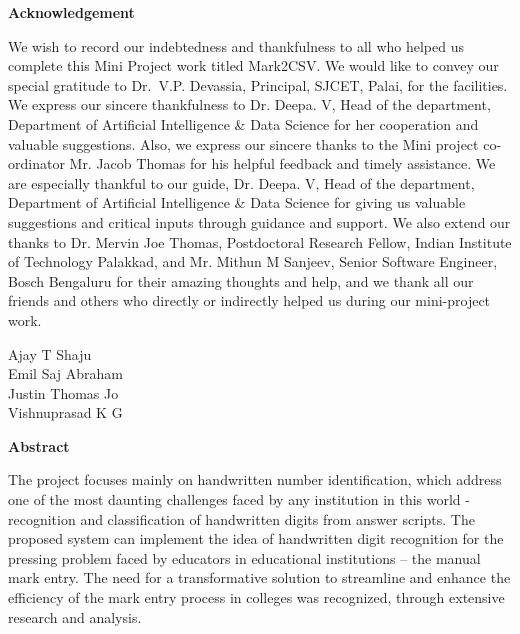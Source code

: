 \newpage
\thispagestyle{empty}
\begin{center}
  \vspace*{1cm}
  \textbf{\large Acknowledgement}
\end{center}
We wish to record our indebtedness and thankfulness to all who helped us complete this Mini Project work titled Mark2CSV. We would like to convey our special gratitude to Dr.~V.P. Devassia, Principal, SJCET, Palai, for the facilities. We express our sincere thankfulness to Dr. Deepa. V, Head of the department, Department of Artificial Intelligence \& Data Science for her cooperation and valuable suggestions. Also, we express our sincere thanks to the Mini project co-ordinator Mr. Jacob Thomas for his helpful feedback and timely assistance.
We are especially thankful to our guide, Dr. Deepa. V, Head of the department, Department of Artificial Intelligence \& Data Science for giving us valuable suggestions and critical inputs through guidance and support. We also extend our thanks to Dr. Mervin Joe Thomas, Postdoctoral Research Fellow, Indian Institute of Technology Palakkad, and Mr. Mithun M Sanjeev, Senior Software Engineer, Bosch Bengaluru for their amazing thoughts and help, and we thank all our friends and others who directly or indirectly helped us during our mini-project work.
 \\
\begin{flushright}
Ajay T Shaju \\
Emil Saj Abraham \\
Justin Thomas Jo \\
Vishnuprasad K G
\end{flushright}

\newpage
\thispagestyle{empty}
\begin{center}
  \textbf{\large Abstract}
\end{center}
The project focuses mainly on handwritten number identification, which address one of the most daunting challenges faced by any institution in this world - recognition and classification of handwritten digits from answer scripts. The proposed system can implement the idea of handwritten digit recognition for the pressing problem faced by educators in educational institutions – the manual mark entry. The need for a transformative solution to streamline and enhance the efficiency of the mark entry process in colleges was recognized, through extensive research and analysis.

